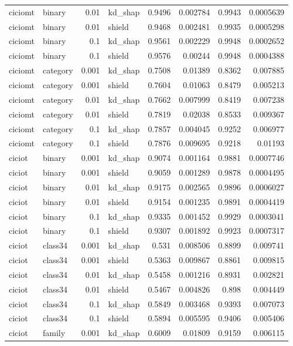 \begin{table}
\begin{tabular}{llrlrrrr}
ciciomt & binary & 0.01 & kd_shap & 0.9496 & 0.002784 & 0.9943 & 0.0005639 \\
ciciomt & binary & 0.01 & shield & 0.9468 & 0.002481 & 0.9935 & 0.0005298 \\
ciciomt & binary & 0.1 & kd_shap & 0.9561 & 0.002229 & 0.9948 & 0.0002652 \\
ciciomt & binary & 0.1 & shield & 0.9576 & 0.00244 & 0.9948 & 0.0004388 \\
ciciomt & category & 0.001 & kd_shap & 0.7508 & 0.01389 & 0.8362 & 0.007885 \\
ciciomt & category & 0.001 & shield & 0.7604 & 0.01063 & 0.8479 & 0.005213 \\
ciciomt & category & 0.01 & kd_shap & 0.7662 & 0.007999 & 0.8419 & 0.007238 \\
ciciomt & category & 0.01 & shield & 0.7819 & 0.02038 & 0.8533 & 0.009367 \\
ciciomt & category & 0.1 & kd_shap & 0.7857 & 0.004045 & 0.9252 & 0.006977 \\
ciciomt & category & 0.1 & shield & 0.7876 & 0.009695 & 0.9218 & 0.01193 \\
ciciot & binary & 0.001 & kd_shap & 0.9074 & 0.001164 & 0.9881 & 0.0007746 \\
ciciot & binary & 0.001 & shield & 0.9059 & 0.001289 & 0.9878 & 0.0004495 \\
ciciot & binary & 0.01 & kd_shap & 0.9175 & 0.002565 & 0.9896 & 0.0006027 \\
ciciot & binary & 0.01 & shield & 0.9154 & 0.001235 & 0.9891 & 0.0004419 \\
ciciot & binary & 0.1 & kd_shap & 0.9335 & 0.001452 & 0.9929 & 0.0003041 \\
ciciot & binary & 0.1 & shield & 0.9307 & 0.001892 & 0.9923 & 0.0007317 \\
ciciot & class34 & 0.001 & kd_shap & 0.531 & 0.008506 & 0.8899 & 0.009741 \\
ciciot & class34 & 0.001 & shield & 0.5363 & 0.009867 & 0.8861 & 0.009815 \\
ciciot & class34 & 0.01 & kd_shap & 0.5458 & 0.001216 & 0.8931 & 0.002821 \\
ciciot & class34 & 0.01 & shield & 0.5467 & 0.004826 & 0.898 & 0.004449 \\
ciciot & class34 & 0.1 & kd_shap & 0.5849 & 0.003468 & 0.9393 & 0.007073 \\
ciciot & class34 & 0.1 & shield & 0.5894 & 0.005595 & 0.9406 & 0.005406 \\
ciciot & family & 0.001 & kd_shap & 0.6009 & 0.01809 & 0.9159 & 0.006115 \\

\end{tabular}
\end{table}
